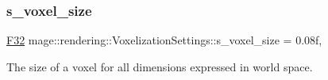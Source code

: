 \subsubsection{\texorpdfstring{s\+\_\+voxel\+\_\+size}{s\_voxel\_size}}
{\footnotesize\ttfamily \hyperlink{namespacemage_aa97e833b45f06d60a0a9c4fc22ae02c0}{F32} mage\+::rendering\+::\+Voxelization\+Settings\+::s\+\_\+voxel\+\_\+size = 0.\+08f\hspace{0.3cm}{\ttfamily [static]}, {\ttfamily [private]}}

The size of a voxel for all dimensions expressed in world space. 
